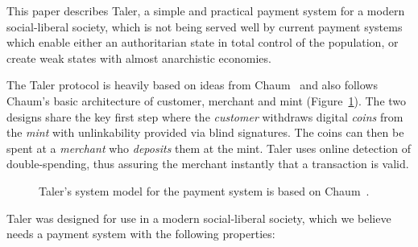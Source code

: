 \documentclass{llncs}
\begin{document}
This paper describes Taler, a simple and practical payment system for
a modern social-liberal society, which is not being served well by
current payment systems which enable either an authoritarian state in
total control of the population, or create weak states with almost
anarchistic economies.

The Taler protocol is heavily based on ideas from
Chaum~\cite{chaum1983blind} and also follows Chaum's basic architecture of
customer, merchant and mint (Figure~\ref{fig:cmm}). The two designs
share the key first step where the {\em customer} withdraws digital
{\em coins} from the {\em mint} with unlinkability provided via blind
signatures.  The coins can then be spent at a {\em merchant} who {\em
  deposits} them at the mint.  Taler uses online detection of
double-spending, thus assuring the merchant instantly that a
transaction is valid.

\begin{figure}[h]
\centering
{}
\caption{Taler's system model for the payment system is based on Chaum~\cite{chaum1983blind}.}
\label{fig:cmm}
\end{figure}

Taler was designed for use in a modern social-liberal society, which we
believe needs a payment system with the following properties:
\end{document}
